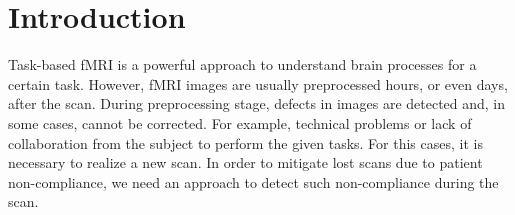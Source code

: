 \documentclass[twocolumn]{bmcart}%
\begin{document}
\begin{frontmatter}
\begin{fmbox}


	








%
\end{fmbox}%

\end{frontmatter}


\section{Introduction}\label{introduction}

Task-based fMRI is a powerful approach to understand brain processes for
a certain task. However, fMRI images are usually preprocessed hours, or
even days, after the scan. During preprocessing stage, defects in images
are detected and, in some cases, cannot be corrected. For example,
technical problems or lack of collaboration from the subject to perform
the given tasks. For this cases, it is necessary to realize a new scan.
In order to mitigate lost scans due to patient non-compliance, we need
an approach to detect such non-compliance during the scan.
\end{document}
